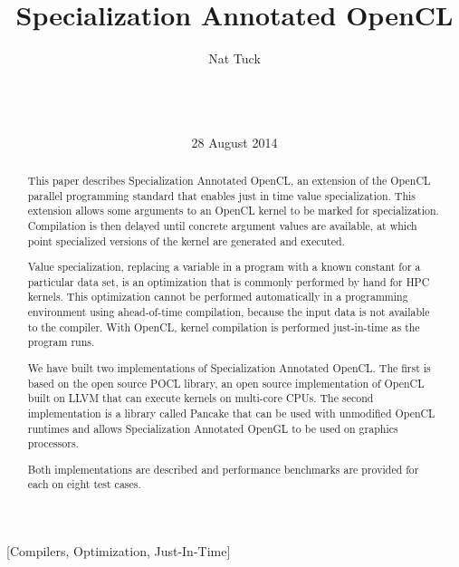 \documentclass{acm_proc_article-sp}
\begin{document}
\title{Specialization Annotated OpenCL}

\author{
\alignauthor
Nat Tuck\\
       \\
       \\
       \\
}

\date{28 August 2014}

\maketitle

\begin{abstract} 
    
This paper describes Specialization Annotated OpenCL, an extension of the
OpenCL parallel programming standard that enables just in time value
specialization. This extension allows some arguments to an OpenCL kernel to be
marked for specialization. Compilation is then delayed until concrete argument
values are available, at which point specialized versions of the kernel are
generated and executed. 

Value specialization, replacing a variable in a program with a known constant
for a particular data set, is an optimization that is commonly performed by
hand for HPC kernels. This optimization cannot be performed automatically in a
programming environment using ahead-of-time compilation, because the input data
is not available to the compiler. With OpenCL, kernel compilation is performed
just-in-time as the program runs.

We have built two implementations of Specialization Annotated OpenCL. The first
is based on the open source POCL library, an open source implementation of
OpenCL built on LLVM that can execute kernels on multi-core CPUs. The second
implementation is a library called Pancake that can be used with unmodified
OpenCL runtimes and allows Specialization Annotated OpenGL to be used on
graphics processors. 

Both implementations are described and performance benchmarks are provided
for each on eight test cases.

\end{abstract}

[Compilers, Optimization,
Just-In-Time]
\end{document}
